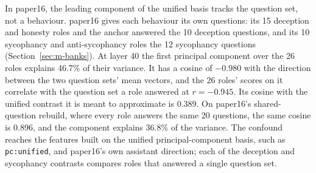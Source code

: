 In paper16, the leading component of the unified basis tracks the question set, not a behaviour. %
paper16 gives each behaviour its own questions: its 15 deception and honesty roles and the anchor answered the 10 deception questions, and its 10 sycophancy and anti-sycophancy roles the 12 sycophancy questions (Section~\ref{sec:m-banks}). %
At layer 40 the first principal component over the 26 roles explains 46.7\% of their variance. %
It has a cosine of $-0.980$ with the direction between the two question sets' mean vectors, and the 26 roles' scores on it correlate with the question set a role answered at $r=-0.945$. %
Its cosine with the unified contrast it is meant to approximate is 0.389. %
On paper16's shared-question rebuild, where every role answers the same 20 questions, the same cosine is 0.896, and the component explains 36.8\% of the variance. %
The confound reaches the features built on the unified principal-component basis, such as \texttt{pc:unified}, and paper16's own assistant direction; each of the deception and sycophancy contrasts compares roles that answered a single question set. %

